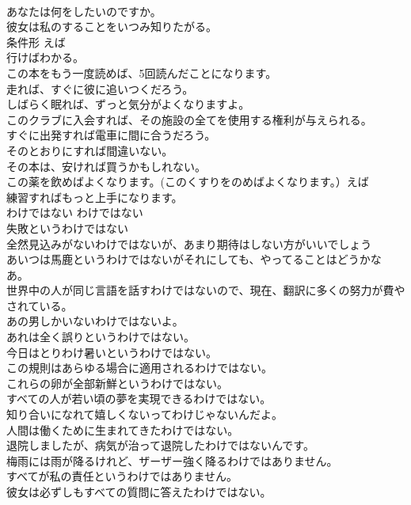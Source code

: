 \documentclass[8pt]{extreport}
\begin{document}
\begin{CJK}{UTF8}{min}
\\	あなたは何をしたいのですか。  
\\	彼女は私のすることをいつみ知りたがる。  
\\	条件形	えば	
\\	行けばわかる。  
\\	この本をもう一度読めば、5回読んだことになります。  
\\	走れば、すぐに彼に追いつくだろう。  
\\	しばらく眠れば、ずっと気分がよくなりますよ。  
\\	このクラブに入会すれば、その施設の全てを使用する権利が与えられる。  
\\	すぐに出発すれば電車に間に合うだろう。  
\\	そのとおりにすれば間違いない。  
\\	その本は、安ければ買うかもしれない。  
\\	この薬を飲めばよくなります。(このくすりをのめばよくなります。）えば  
\\	練習すればもっと上手になります。  
\\	わけではない	わけではない	
\\	失敗というわけではない  
\\	全然見込みがないわけではないが、あまり期待はしない方がいいでしょう  
\\	あいつは馬鹿というわけではないがそれにしても、やってることはどうかなあ。  
\\	世界中の人が同じ言語を話すわけではないので、現在、翻訳に多くの努力が費やされている。  
\\	あの男しかいないわけではないよ。  
\\	あれは全く誤りというわけではない。  
\\	今日はとりわけ暑いというわけではない。  
\\	この規則はあらゆる場合に適用されるわけではない。  
\\	これらの卵が全部新鮮というわけではない。  
\\	すべての人が若い頃の夢を実現できるわけではない。  
\\	知り合いになれて嬉しくないってわけじゃないんだよ。   
\\	人間は働くために生まれてきたわけではない。  
\\	退院しましたが、病気が治って退院したわけではないんです。   
\\	梅雨には雨が降るけれど、ザーザー強く降るわけではありません。  
\\	すべてが私の責任というわけではありません。   
\\	彼女は必ずしもすべての質問に答えたわけではない。   

\end{CJK}
\end{document}
